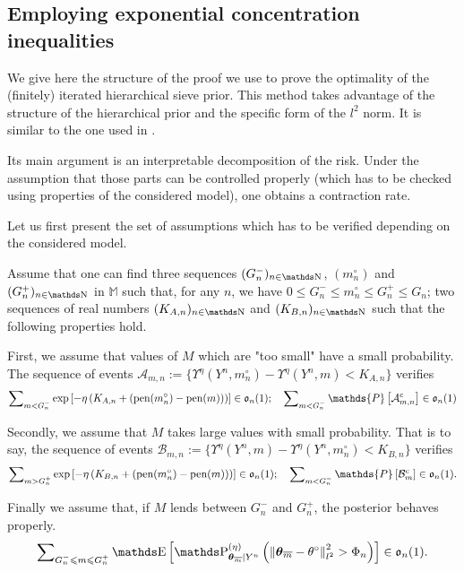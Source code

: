 \subsection{Employing exponential concentration inequalities}\label{BAYES_STRATEGIES_EXPO}
We give here the structure of the proof we use to prove the optimality of the (finitely) iterated hierarchical sieve prior.
This method takes advantage of the structure of the hierarchical prior and the specific form of the $l^{2}$ norm.
It is similar to the one used in .

Its main argument is an interpretable decomposition of the risk.
Under the assumption that those parts can be controlled properly (which has to be checked using properties of the considered model), one obtains a contraction rate.

Let us first present the set of assumptions which has to be verified depending on the considered model.

\begin{as}\label{AS_BAYES_STRATEGIES_EXPO}
Assume that one can find three sequences $(G_{n}^{-})_{n \in \N}$, $(m^{\circ}_{n})$ and $(G_{n}^{+})_{n \in \N}$ in $\mathds{M}$ such that, for any $n$, we have $0 \leq G_{n}^{-} \leq m^{\circ}_{n} \leq G_{n}^{+} \leq G_{n}$; two sequences of real numbers $(K_{A, n})_{n \in \N}$ and $(K_{B, n})_{n \in \N}$ such that the following properties hold.

\medskip

First, we assume that values of $M$ which are "too small" have a small probability.
The sequence of events $\mathcal{A}_{m, n} := \{\Upsilon^{\eta}(Y^{n}, m^{\circ}_{n}) - \Upsilon^{\eta}(Y^{n}, m) < K_{A, n}\}$ verifies
\[ \sum\nolimits_{m < G^{-}_{n}} \exp\left[-\eta\left(K_{A, n} + (\pen(m^{\circ}_{n}) - \pen(m))\right)\right] \in \mathfrak{o}_{n}(1); \quad \sum\nolimits_{m < G^{-}_{n}}\mathds{P}\left[ \mathcal{A}_{m, n}^{c}\right] \in \mathfrak{o}_{n}(1)\]

\medskip

Secondly, we assume that $M$ takes large values with small probability.
That is to say, the sequence of events $\mathcal{B}_{m, n} := \{\Upsilon^{\eta}(Y^{n}, m) - \Upsilon^{\eta}(Y^{n},m^{\circ}_{n}) < K_{B, n}\}$ verifies
\[ \sum\nolimits_{m > G^{+}_{n}} \exp\left[- \eta\left(K_{B, n} + (\pen(m^{\circ}_{n}) - \pen(m))\right)\right] \in \mathfrak{o}_{n}(1); \quad \sum\nolimits_{m < G^{-}_{n}}\mathds{P}\left[ \mathcal{B}_{m}^{c}\right] \in \mathfrak{o}_{n}(1).\]

\medskip

Finally we assume that, if $M$ lends between $G^{-}_{n}$ and $G^{+}_{n}$, the posterior behaves properly.
\[\sum\nolimits_{G^{-}_{n} \leq m \leq G^{+}_{n}} \E\left[\P_{\boldsymbol{\theta}_{\overline{m}} \vert Y^{n}}^{(\eta)} \left(\left\Vert \boldsymbol{\theta}_{\overline{m}} - \theta^{\circ} \right\Vert_{l^{2}}^{2} > \Phi_{n}\right)\right] \in \mathfrak{o}_{n}(1).\]
\assEnd
\end{as}

